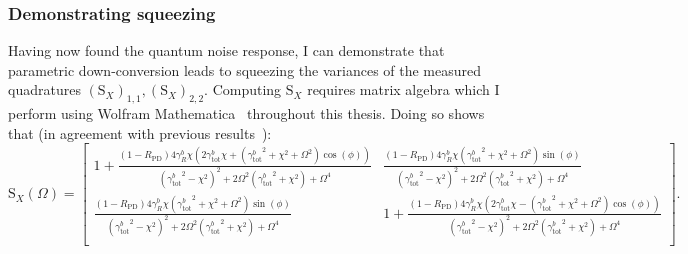 \subsubsection{Demonstrating squeezing}

Having now found the quantum noise response, I can demonstrate that parametric down-conversion leads to squeezing the variances of the measured quadratures $(\text{S}_X)_{1,1}, (\text{S}_X)_{2,2}$. Computing $\text{S}_X$ requires matrix algebra which I perform using Wolfram Mathematica~\cite{} throughout this thesis. Doing so shows that (in agreement with previous results~\cite{}): 
\begin{equation}\label{eq:dOPO_full_freedom}
\text{S}_X(\Omega)=\left[
\begin{array}{cc}
 1+\frac{(1-R_\text{PD})4 \gamma^b_R \chi  \left(2 \gamma^b_\text{tot} \chi +\left({\gamma^b_\text{tot}}^2+\chi ^2+\Omega ^2\right) \cos (\phi )\right)}{\left({\gamma^b_\text{tot}}^2-\chi ^2\right)^2+2 \Omega ^2 \left({\gamma^b_\text{tot}}^2+\chi ^2\right)+\Omega ^4} 
 & \frac{(1-R_\text{PD})4 \gamma^b_R \chi  \left({\gamma^b_\text{tot}}^2+\chi ^2+\Omega ^2\right) \sin (\phi )}{\left({\gamma^b_\text{tot}}^2-\chi ^2\right)^2+2 \Omega ^2 \left({\gamma^b_\text{tot}}^2+\chi ^2\right)+\Omega ^4} \\
 \frac{(1-R_\text{PD})4 \gamma^b_R \chi  \left({\gamma^b_\text{tot}}^2+\chi ^2+\Omega ^2\right) \sin (\phi )}{\left({\gamma^b_\text{tot}}^2-\chi ^2\right)^2+2 \Omega ^2 \left({\gamma^b_\text{tot}}^2+\chi ^2\right)+\Omega ^4} 
 & 1+\frac{(1-R_\text{PD})4 \gamma^b_R \chi  \left(2 \gamma^b_\text{tot} \chi -\left({\gamma^b_\text{tot}}^2+\chi ^2+\Omega ^2\right) \cos (\phi )\right)}{\left({\gamma^b_\text{tot}}^2-\chi ^2\right)^2+2 \Omega ^2 \left({\gamma^b_\text{tot}}^2+\chi ^2\right)+\Omega ^4} \\
\end{array}
\right].\end{equation}
